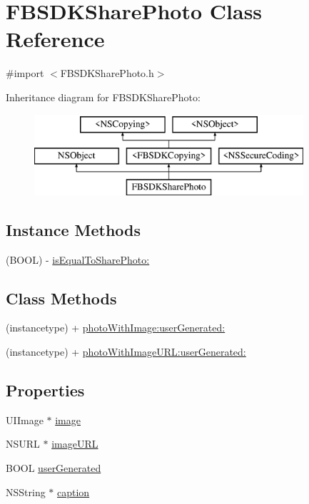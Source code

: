 \hypertarget{interface_f_b_s_d_k_share_photo}{}\section{F\+B\+S\+D\+K\+Share\+Photo Class Reference}
\label{interface_f_b_s_d_k_share_photo}


{\ttfamily \#import $<$F\+B\+S\+D\+K\+Share\+Photo.\+h$>$}

Inheritance diagram for F\+B\+S\+D\+K\+Share\+Photo\+:\begin{figure}[H]
\begin{center}
\leavevmode
\includegraphics[height=3.000000cm]{interface_f_b_s_d_k_share_photo}
\end{center}
\end{figure}
\subsection*{Instance Methods}
\begin{DoxyCompactItemize}
\item 
(B\+O\+O\+L) -\/ \hyperlink{interface_f_b_s_d_k_share_photo_a7ab3bebfb4771c5594b574efe97acf63}{is\+Equal\+To\+Share\+Photo\+:}
\end{DoxyCompactItemize}
\subsection*{Class Methods}
\begin{DoxyCompactItemize}
\item 
(instancetype) + \hyperlink{interface_f_b_s_d_k_share_photo_acb6bc925c555825f19c611f206a22974}{photo\+With\+Image\+:user\+Generated\+:}
\item 
(instancetype) + \hyperlink{interface_f_b_s_d_k_share_photo_a451163cb75cb0a80fa4e6f0b2af4cb29}{photo\+With\+Image\+U\+R\+L\+:user\+Generated\+:}
\end{DoxyCompactItemize}
\subsection*{Properties}
\begin{DoxyCompactItemize}
\item 
U\+I\+Image $\ast$ \hyperlink{interface_f_b_s_d_k_share_photo_a93f461424066ad2f65b58902d95d5470}{image}
\item 
N\+S\+U\+R\+L $\ast$ \hyperlink{interface_f_b_s_d_k_share_photo_a499fdf232b43b9222e9db5f320bda63d}{image\+U\+R\+L}
\item 
B\+O\+O\+L \hyperlink{interface_f_b_s_d_k_share_photo_aaa348d2490f0f01361054cf06af7fc4a}{user\+Generated}
\item 
N\+S\+String $\ast$ \hyperlink{interface_f_b_s_d_k_share_photo_a378bd927653780e0ad52400dd095c333}{caption}
\end{DoxyCompactItemize}


